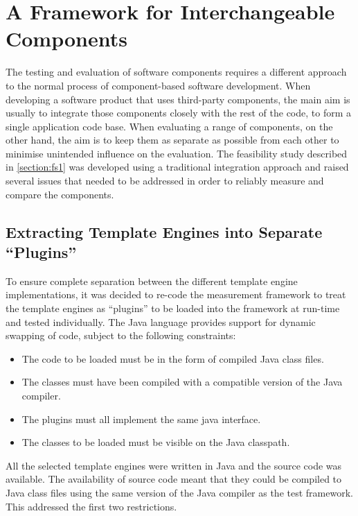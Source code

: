 \section{A Framework for Interchangeable Components}
\label{section:comp:framework}

The testing and evaluation of software components requires a different approach to the normal process of component-based software development. When developing a software product that uses third-party components, the main aim is usually to integrate those components closely with the rest of the code, to form a single application code base. When evaluating a range of components, on the other hand, the aim is to keep them as separate as possible from each other to minimise unintended influence on the evaluation. The feasibility study described in \autoref{section:fs1} was developed using a traditional integration approach and raised several issues that needed to be addressed in order to reliably measure and compare the components.

\subsection{Extracting Template Engines into Separate \enquote{Plugins}}
\label{section:comp:plugins}

To ensure complete separation between the different \gls{template engine} implementations, it was decided to re-code the measurement framework to treat the \gls{template engine}s as \enquote{plugins} to be loaded into the framework at run-time and tested individually. The Java language provides support for dynamic swapping of code, subject to the following constraints:

\begin{itemize}
    \item The code to be loaded must be in the form of compiled Java class files.
    \item The classes must have been compiled with a compatible version of the Java compiler.
    \item The plugins must all implement the same java interface.
    \item The classes to be loaded must be visible on the Java \gls{classpath}.
\end{itemize}

\label{A143}
All the selected template engines were written in Java and the source code was available. The availability of source code meant that they could be compiled to Java class files using the same version of the Java compiler as the test framework. This addressed the first two restrictions.

